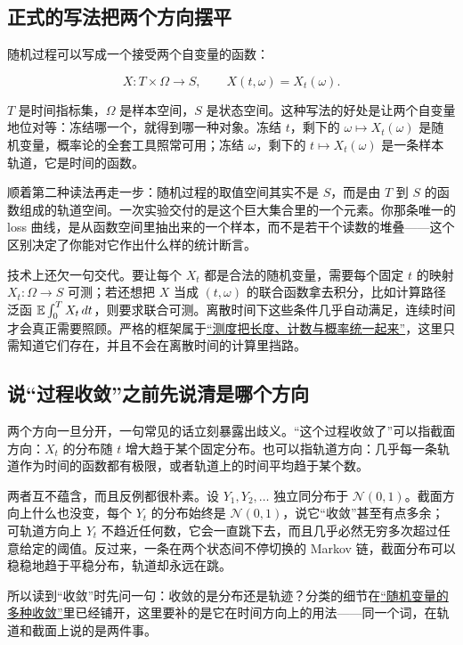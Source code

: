 \subsection{正式的写法把两个方向摆平}

随机过程可以写成一个接受两个自变量的函数：

\[
X : T \times \Omega \to S,\qquad X(t,\omega) = X_t(\omega).
\]

\(T\) 是时间指标集，\(\Omega\) 是样本空间，\(S\) 是状态空间。这种写法的好处是让两个自变量地位对等：冻结哪一个，就得到哪一种对象。冻结 \(t\)，剩下的 \(\omega \mapsto X_t(\omega)\) 是随机变量，概率论的全套工具照常可用；冻结 \(\omega\)，剩下的 \(t \mapsto X_t(\omega)\) 是一条样本轨道，它是时间的函数。

顺着第二种读法再走一步：随机过程的取值空间其实不是 \(S\)，而是由 \(T\) 到 \(S\) 的函数组成的轨道空间。一次实验交付的是这个巨大集合里的一个元素。你那条唯一的 loss 曲线，是从函数空间里抽出来的一个样本，而不是若干个读数的堆叠——这个区别决定了你能对它作出什么样的统计断言。

技术上还欠一句交代。要让每个 \(X_t\) 都是合法的随机变量，需要每个固定 \(t\) 的映射 \(X_t : \Omega \to S\) 可测；若还想把 \(X\) 当成 \((t,\omega)\) 的联合函数拿去积分，比如计算路径泛函 \(\mathbb{E}\int_0^{T} X_t\,dt\)，则要求联合可测。离散时间下这些条件几乎自动满足，连续时间才会真正需要照顾。严格的框架属于\hyperref[sec:12-Real-Analysis-Support/05-Measure-Integration-and-Conditional-Expectation/02]{``测度把长度、计数与概率统一起来''}，这里只需知道它们存在，并且不会在离散时间的计算里挡路。

\subsection{说``过程收敛''之前先说清是哪个方向}

两个方向一旦分开，一句常见的话立刻暴露出歧义。``这个过程收敛了''可以指截面方向：\(X_t\) 的分布随 \(t\) 增大趋于某个固定分布。也可以指轨道方向：几乎每一条轨道作为时间的函数都有极限，或者轨道上的时间平均趋于某个数。

两者互不蕴含，而且反例都很朴素。设 \(Y_1,Y_2,\ldots\) 独立同分布于 \(\mathcal N(0,1)\)。截面方向上什么也没变，每个 \(Y_t\) 的分布始终是 \(\mathcal N(0,1)\)，说它``收敛''甚至有点多余；可轨道方向上 \(Y_t\) 不趋近任何数，它会一直跳下去，而且几乎必然无穷多次超过任意给定的阈值。反过来，一条在两个状态间不停切换的 Markov 链，截面分布可以稳稳地趋于平稳分布，轨道却永远在跳。

所以读到``收敛''时先问一句：收敛的是分布还是轨迹？分类的细节在\hyperref[sec:05-Probability/08-Limit-Theorems/01]{``随机变量的多种收敛''}里已经铺开，这里要补的是它在时间方向上的用法——同一个词，在轨道和截面上说的是两件事。

